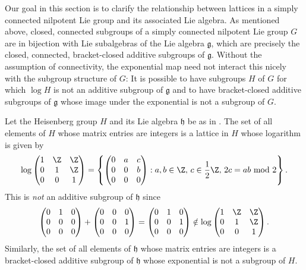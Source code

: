 Our goal in this section is to clarify the relationship between lattices in a simply connected nilpotent Lie group and its associated Lie algebra.
As mentioned above, closed, connected subgroups of a simply connected nilpotent Lie group $G$ are in bijection with Lie subalgebras of the Lie algebra $\mathfrak{g}$, which are precisely the closed, connected, bracket-closed additive subgroups of $\mathfrak{g}$. Without the assumption of connectivity, the exponential map need not interact this nicely with the subgroup structure of $G$: It is possible to have subgroups $H$ of $G$ for which $\log H$ is not an additive subgroup of $\mathfrak{g}$ and to have bracket-closed additive subgroups of $\mathfrak{g}$ whose image under the exponential is not a subgroup of $G$. 

\begin{example}
\label{ex:heisenberg_subgroups}
Let the Heisenberg group $H$ and its Lie algebra $\mathfrak{h}$ be as in . The set of all elements of $H$ whose matrix entries are integers is a lattice in $H$ whose logarithm is given by
\[
\log \left(\begin{matrix} 1 & \Z & \Z \\ 0 & 1 & \Z \\ 0&0&1\end{matrix}\right) = \left\{ \left(\begin{matrix} 0 & a & c \\ 0 & 0 & b \\ 0&0&0\end{matrix}\right) : a,b\in \Z,\, c \in \frac{1}{2}\Z,\, 2c=ab \text{ mod } 2 \right\}.
\]
This is \emph{not} an additive subgroup of $\mathfrak{h}$ since
\[
\left(\begin{matrix} 0 & 1 & 0 \\ 0 & 0 & 0 \\ 0&0&0\end{matrix}\right) + \left(\begin{matrix} 0 & 0 & 0 \\ 0 & 0 & 1 \\ 0&0&0\end{matrix}\right) = \left(\begin{matrix} 0 & 1 & 0 \\ 0 & 0 & 1 \\ 0&0&0\end{matrix}\right) \notin \log \left(\begin{matrix} 1 & \Z & \Z \\ 0 & 1 & \Z \\ 0&0&1\end{matrix}\right).
\]
 Similarly, the set of all elements of $\mathfrak{h}$ whose matrix entries are integers is a bracket-closed additive subgroup of $\mathfrak{h}$ whose exponential is not a subgroup of $H$.
%
%
%
%
%
%
%
\end{example}


